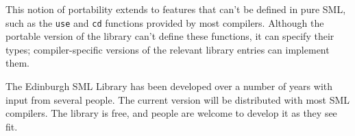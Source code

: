 This notion of portability extends to features that can't be defined
in pure SML, such as the {\tt use} and {\tt cd} functions provided by
most compilers.  Although the portable version of the library
can't define these functions, it can specify their types;
compiler-specific versions of the relevant library entries can
implement them.

The Edinburgh SML Library has been developed over a number of years with
input from several people.  The current version will be distributed
with most SML compilers.  The library is free, and people are welcome
to develop it as they see fit.
